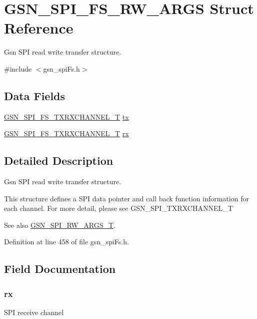 \hypertarget{a00235}{
\section{GSN\_\-SPI\_\-FS\_\-RW\_\-ARGS Struct Reference}
\label{a00235}
}


Gsn SPI read write transfer structure.  




{\ttfamily \#include $<$gsn\_\-spiFs.h$>$}

\subsection*{Data Fields}
\begin{DoxyCompactItemize}
\item 
\hyperlink{a00237}{GSN\_\-SPI\_\-FS\_\-TXRXCHANNEL\_\-T} \hyperlink{a00235_afa4a614da4ba8222e2bc91faf9e1d471}{tx}
\item 
\hyperlink{a00237}{GSN\_\-SPI\_\-FS\_\-TXRXCHANNEL\_\-T} \hyperlink{a00235_a4cbe2099b583d3f4ff890a31d7a2efe6}{rx}
\end{DoxyCompactItemize}


\subsection{Detailed Description}
Gsn SPI read write transfer structure. 

This structure defines a SPI data pointer and call back function information for each channel. For more detail, please see GSN\_\-SPI\_\-TXRXCHANNEL\_\-T

\begin{DoxySeeAlso}{See also}
\hyperlink{a00655_ga9da696c71bee0cdc5b3365d5d055e389}{GSN\_\-SPI\_\-RW\_\-ARGS\_\-T}. 
\end{DoxySeeAlso}


Definition at line 458 of file gsn\_\-spiFs.h.



\subsection{Field Documentation}
\hypertarget{a00235_a4cbe2099b583d3f4ff890a31d7a2efe6}{
\subsubsection[{rx}]{ {\bf rx}}}
\label{a00235_a4cbe2099b583d3f4ff890a31d7a2efe6}
SPI receive channel 

